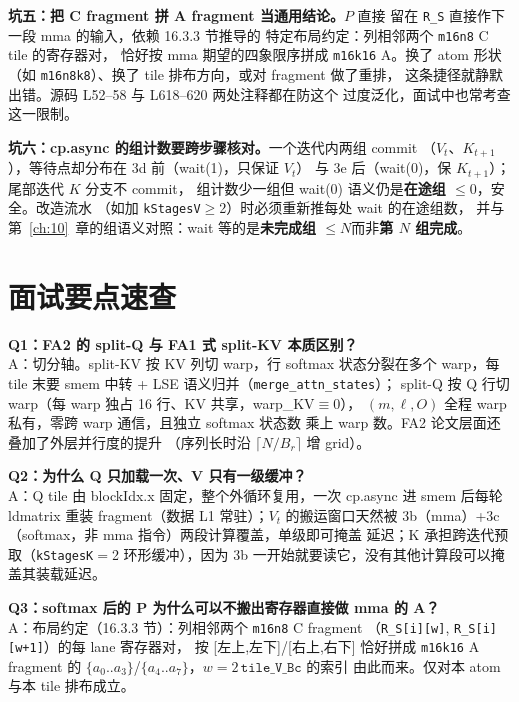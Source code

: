 \textbf{坑五：把 C fragment 拼 A fragment 当通用结论。}$P$ 直接
留在 \texttt{R\_S} 直接作下一段 mma 的输入，依赖 16.3.3 节推导的
特定布局约定：列相邻两个 \texttt{m16n8} C tile 的寄存器对，
恰好按 mma 期望的四象限序拼成 \texttt{m16k16} A。换了 atom 形状
（如 \texttt{m16n8k8}）、换了 tile 排布方向，或对 fragment 做了重排，
这条捷径就静默出错。源码 L52--58 与 L618--620 两处注释都在防这个
过度泛化，面试中也常考查这一限制。

\textbf{坑六：cp.async 的组计数要跨步骤核对。}一个迭代内两组 commit
（$V_t$、$K_{t+1}$），等待点却分布在 3d 前（wait(1)，只保证 $V_t$）
与 3e 后（wait(0)，保 $K_{t+1}$）；尾部迭代 $K$ 分支不 commit，
组计数少一组但 wait(0) 语义仍是\textbf{在途组 $\le 0$}，安全。改造流水
（如加 \texttt{kStagesV}$\ge$2）时必须重新推每处 wait 的在途组数，
并与第~\ref{ch:10}~章的组语义对照：wait 等的是\textbf{未完成组
$\le N$}而非\textbf{第 $N$ 组完成}。

\section{面试要点速查}

\textbf{Q1：FA2 的 split-Q 与 FA1 式 split-KV 本质区别？}\\
A：切分轴。split-KV 按 KV 列切 warp，行 softmax 状态分裂在多个
warp，每 tile 末要 smem 中转 + LSE 语义归并（\texttt{merge\_\allowbreak{}attn\_\allowbreak{}states}）；
split-Q 按 Q 行切 warp（每 warp 独占 16 行、KV 共享，warp\_KV$\equiv$0），
$(m,\ell,O)$ 全程 warp 私有，零跨 warp 通信，且独立 softmax 状态数
乘上 warp 数。FA2 论文层面还叠加了外层并行度的提升
（序列长时沿 $\lceil N/B_r\rceil$ 增 grid）。

\textbf{Q2：为什么 Q 只加载一次、V 只有一级缓冲？}\\
A：Q tile 由 blockIdx.x 固定，整个外循环复用，一次 cp.async 进 smem
后每轮 ldmatrix 重装 fragment（数据 L1 常驻）；$V_t$ 的搬运窗口天然被
3b（mma）+3c（softmax，非 mma 指令）两段计算覆盖，单级即可掩盖
延迟；K 承担跨迭代预取（\texttt{kStagesK}$=$2 环形缓冲），因为 3b
一开始就要读它，没有其他计算段可以掩盖其装载延迟。

\textbf{Q3：softmax 后的 P 为什么可以不搬出寄存器直接做 mma 的 A？}\\
A：布局约定（16.3.3 节）：列相邻两个 \texttt{m16n8} C fragment
（\texttt{R\_S[i][w]}, \texttt{R\_S[i][w+1]}）的每 lane 寄存器对，
按 [左上,左下]/[右上,右下] 恰好拼成 \texttt{m16k16} A fragment 的
$\{a_0..a_3\}$/$\{a_4..a_7\}$，$w=2\,\texttt{tile\_V\_Bc}$ 的索引
由此而来。仅对本 atom 与本 tile 排布成立。

